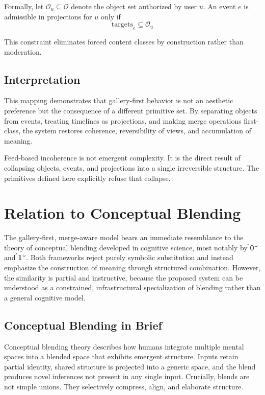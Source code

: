 \documentclass[11pt,oneside]{article}
\begin{document}
Formally, let $\mathcal{O}_u \subseteq \mathcal{O}$ denote the object set authorized by user $u$. An event $e$ is admissible in projections for $u$ only if
\[
\mathrm{targets}_e \subseteq \mathcal{O}_u
\]

This constraint eliminates forced content classes by construction rather than moderation.

\subsection{Interpretation}

This mapping demonstrates that gallery-first behavior is not an aesthetic preference but the consequence of a different primitive set. By separating objects from events, treating timelines as projections, and making merge operations first-class, the system restores coherence, reversibility of views, and accumulation of meaning.

Feed-based incoherence is not emergent complexity. It is the direct result of collapsing objects, events, and projections into a single irreversible structure. The primitives defined here explicitly refuse that collapse.

\section{Relation to Conceptual Blending}

The gallery-first, merge-aware model bears an immediate resemblance to the theory of conceptual blending developed in cognitive science, most notably by \textbf{0} and \textbf{1}. Both frameworks reject purely symbolic substitution and instead emphasize the construction of meaning through structured combination. However, the similarity is partial and instructive, because the proposed system can be understood as a constrained, infrastructural specialization of blending rather than a general cognitive model.

\subsection{Conceptual Blending in Brief}

Conceptual blending theory describes how humans integrate multiple mental spaces into a blended space that exhibits emergent structure. Inputs retain partial identity, shared structure is projected into a generic space, and the blend produces novel inferences not present in any single input. Crucially, blends are not simple unions. They selectively compress, align, and elaborate structure.
\end{document}
